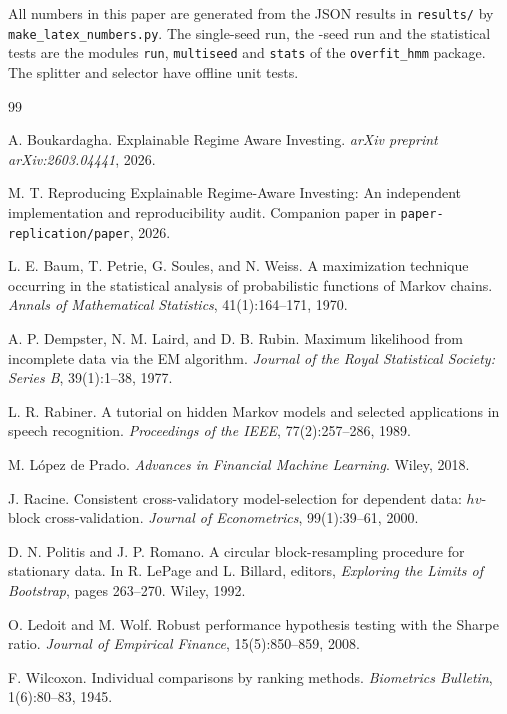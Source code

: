 \documentclass[11pt]{article}
\begin{document}
All numbers in this paper are generated from the JSON results in \texttt{results/} by \texttt{make\_latex\_\allowbreak numbers.py}. The single-seed run, the \NSeeds{}-seed run and the statistical tests are the modules \texttt{run}, \texttt{multiseed} and \texttt{stats} of the \texttt{overfit\_hmm} package. The splitter and selector have offline unit tests.

\begin{thebibliography}{99}

A. Boukardagha.
\newblock Explainable Regime Aware Investing.
\newblock \emph{arXiv preprint arXiv:2603.04441}, 2026.

M. T.
\newblock Reproducing Explainable Regime-Aware Investing: An independent implementation and reproducibility audit.
\newblock Companion paper in \texttt{paper-replication/paper}, 2026.

L. E. Baum, T. Petrie, G. Soules, and N. Weiss.
\newblock A maximization technique occurring in the statistical analysis of probabilistic functions of Markov chains.
\newblock \emph{Annals of Mathematical Statistics}, 41(1):164--171, 1970.

A. P. Dempster, N. M. Laird, and D. B. Rubin.
\newblock Maximum likelihood from incomplete data via the EM algorithm.
\newblock \emph{Journal of the Royal Statistical Society: Series B}, 39(1):1--38, 1977.

L. R. Rabiner.
\newblock A tutorial on hidden Markov models and selected applications in speech recognition.
\newblock \emph{Proceedings of the IEEE}, 77(2):257--286, 1989.

M. L\'opez de Prado.
\newblock \emph{Advances in Financial Machine Learning}.
\newblock Wiley, 2018.

J. Racine.
\newblock Consistent cross-validatory model-selection for dependent data: $hv$-block cross-validation.
\newblock \emph{Journal of Econometrics}, 99(1):39--61, 2000.

D. N. Politis and J. P. Romano.
\newblock A circular block-resampling procedure for stationary data.
\newblock In R. LePage and L. Billard, editors, \emph{Exploring the Limits of Bootstrap}, pages 263--270. Wiley, 1992.

O. Ledoit and M. Wolf.
\newblock Robust performance hypothesis testing with the Sharpe ratio.
\newblock \emph{Journal of Empirical Finance}, 15(5):850--859, 2008.

F. Wilcoxon.
\newblock Individual comparisons by ranking methods.
\newblock \emph{Biometrics Bulletin}, 1(6):80--83, 1945.

\end{thebibliography}
\end{document}
